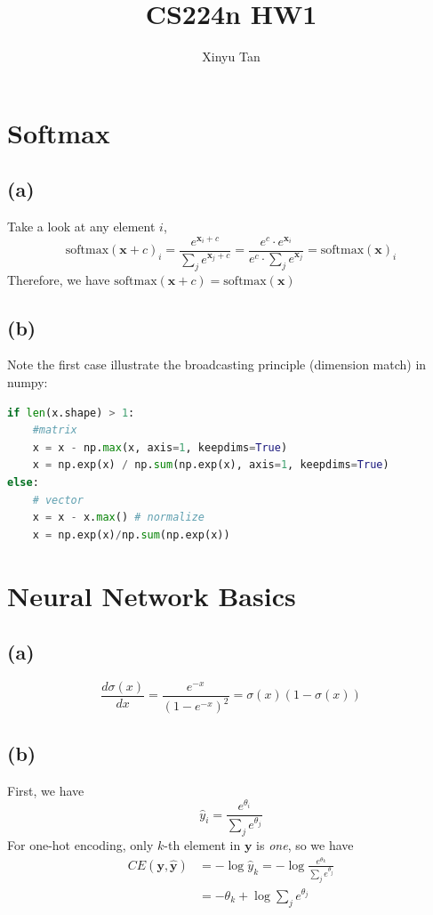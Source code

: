 \documentclass[12pt]{article}
\begin{document}
\title{CS224n HW1}
\author{Xinyu Tan}
\maketitle

\section {Softmax}
\subsection*{(a)}
Take a look at any element $i$, 
$$
\text{softmax}(\bm x + c)_i = \frac{e^{\bm x_i + c}}{\sum_{j} e^ {\bm x_j + c}} = \frac{e^c \cdot e^{\bm x_i}}{e^c \cdot \sum_j e^{\bm x_j}} = \text{softmax}(\bm x )_i 
$$
Therefore, we have $\text{softmax}(\bm x + c) = \text{softmax}(\bm x)$

\subsection*{(b)}
Note the first case illustrate the broadcasting principle (dimension match) in numpy:
\begin{lstlisting}[language=Python]
if len(x.shape) > 1:
	#matrix
	x = x - np.max(x, axis=1, keepdims=True)
	x = np.exp(x) / np.sum(np.exp(x), axis=1, keepdims=True)
else:
	# vector
	x = x - x.max() # normalize
	x = np.exp(x)/np.sum(np.exp(x))
\end{lstlisting}


\section{Neural Network Basics}
\subsection*{(a)}
$$
\frac{d \sigma (x)}{dx} = \frac{e^{-x}}{(1-e^{-x})^2} = \sigma(x) (1 - \sigma(x))
$$

\subsection*{(b)}
First, we have
	$$\hat y_i = \frac{e^{\theta_i}}{\sum_j e^{\theta_j}}$$
For one-hot encoding, only $k$-th element in $\bm y$ is \emph{one}, so we have
\begin{align*}
CE(\bm y, \bm {\hat y}) &= - \log \hat y_k = - \log \frac{e^{\theta_k}}{\sum_j e^{\theta_j}} \\
				&= - \theta_k + \log \sum_j e^{\theta_j}
\end{align*}
\end{document}
